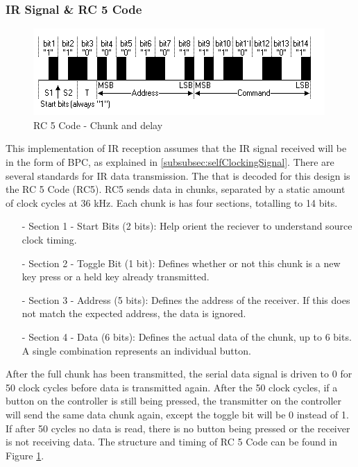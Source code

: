\documentclass[]{article}
\begin{document}
\subsubsection{IR Signal \& RC 5 Code}
\begin{figure}[H]\centering
    \includegraphics[width=\linewidth]{figures/RC5_Timing.png}
    \caption{RC 5 Code - Chunk and delay \cite{rc5Timing}}
    \label{fig:rc5Code}
\end{figure}
This implementation of IR reception assumes that the IR signal received will be in the form of BPC, as explained in \ref{subsubsec:selfClockingSignal}.
There are several standards for IR data transmission. The that is decoded for this design is the RC 5 Code (RC5).
RC5 sends data in chunks, separated by a static amount of clock cycles at 36 kHz. Each chunk is has four sections, totalling to 14 bits.
\begin{itemize}
    \item[-] Section 1 - Start Bits (2 bits): Help orient the reciever to understand source clock timing.
    \item[-] Section 2 - Toggle Bit (1 bit): Defines whether or not this chunk is a new key press or a held key already transmitted.
    \item[-] Section 3 - Address (5 bits): Defines the address of the receiver. If this does not match the expected address, the data is ignored.
    \item[-] Section 4 - Data (6 bits): Defines the actual data of the chunk, up to 6 bits. A single combination represents an individual button.
\end{itemize}
After the full chunk has been transmitted, the serial data signal is driven to 0 for 50 clock cycles before data is transmitted again.
After the 50 clock cycles, if a button on the controller is still being pressed, the transmitter on the controller will send the same data chunk again, except the toggle bit will be 0 instead of 1.
If after 50 cycles no data is read, there is no button being pressed or the receiver is not receiving data.\cite{vishayIr}
The structure and timing of RC 5 Code can be found in Figure \ref{fig:rc5Code}.
\end{document}
